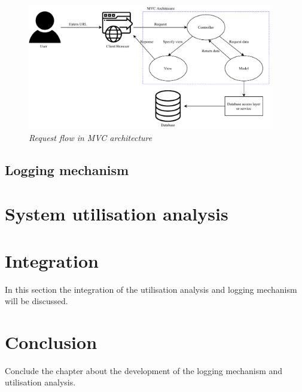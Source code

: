 \begin{figure}[!htb] %
	\centering %
	\includegraphics[width=0.95\textwidth]{Images/Chapter2/Flow_MVC_Architecture/Flow_MVC_Architecture.pdf}
	\caption[Request flow in MVC architecture]
	{\textit{Request flow in MVC architecture \cite{Gu2010}}}\label{fig:ch2_Flow_MVC_Architecture}
\end{figure}

\subsection{Logging mechanism}

\section{System utilisation analysis}

\section{Integration}
In this section the integration of the utilisation analysis and logging mechanism will be discussed.

\section{Conclusion}
Conclude the chapter about the development of the logging mechanism and utilisation analysis.